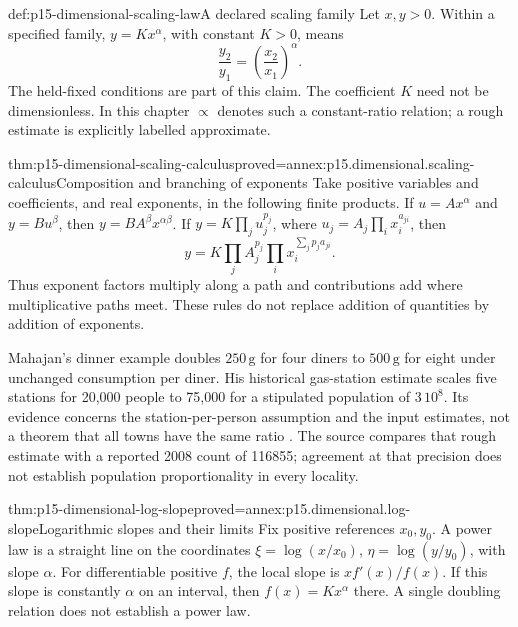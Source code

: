 \begin{hbdefinition}{def:p15-dimensional-scaling-law}{A declared scaling family}
Let \(x,y>0\). Within a specified family, \(y=Kx^\alpha\), with constant
\(K>0\), means
\[
 \frac{y_2}{y_1}=\left(\frac{x_2}{x_1}\right)^\alpha.
\]
The held-fixed conditions are part of this claim. The coefficient \(K\)
need not be dimensionless. In this chapter \(\propto\) denotes such a
constant-ratio relation; a rough estimate is explicitly labelled approximate.
\end{hbdefinition}

\begin{hbtheorem}{thm:p15-dimensional-scaling-calculus}{proved=annex:p15.dimensional.scaling-calculus}{Composition and branching of exponents}
Take positive variables and coefficients, and real exponents, in the
following finite products.
If \(u=Ax^\alpha\) and \(y=Bu^\beta\), then
\(y=BA^\beta x^{\alpha\beta}\).
If \(y=K\prod_j u_j^{p_j}\), where
\(u_j=A_j\prod_i x_i^{a_{ji}}\), then
\[
 y=K\prod_j A_j^{p_j}\prod_i x_i^{\sum_jp_j a_{ji}}.
\]
Thus exponent factors multiply along a path and contributions add where
multiplicative paths meet. These rules do not replace addition of quantities
by addition of exponents.
\end{hbtheorem}

Mahajan's dinner example doubles \(250\,\mathrm g\) for four diners to
\(500\,\mathrm g\) for eight under unchanged consumption per diner.
His historical gas-station estimate scales five stations for 20,000 people
to 75,000 for a stipulated population of \(3\,10^8\). Its evidence concerns
the station-per-person assumption and the input estimates, not a theorem
that all towns have the same ratio \cite[4.1]{Mahajan2014Insight}.
The source compares that rough estimate with a reported 2008 count of
116855; agreement at that precision does not establish population
proportionality in every locality.

\begin{hbtheorem}{thm:p15-dimensional-log-slope}{proved=annex:p15.dimensional.log-slope}{Logarithmic slopes and their limits}
Fix positive references \(x_0,y_0\). A power law is a straight line on
the coordinates \(\xi=\log(x/x_0)\), \(\eta=\log(y/y_0)\), with slope
\(\alpha\). For differentiable positive \(f\), the local slope is
\(xf'(x)/f(x)\). If this slope is constantly \(\alpha\) on an interval,
then \(f(x)=Kx^\alpha\) there.
A single doubling relation does not establish a power law.
\end{hbtheorem}

